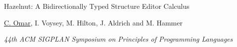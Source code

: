 \documentclass[10pt,letterpaper]{article}
\renewenvironment{itemize}{
  \begin{list}{}{
    \setlength{\leftmargin}{1.25em}
    \setlength{\itemsep}{0.25em}
    \setlength{\parskip}{0pt}
    \setlength{\parsep}{0.2em}
  }
}{
  \end{list}
}
\begin{document}
\begin{enumerate}[leftmargin=*, labelindent=6.5em, font=\bfseries]
  \item[POPL 2017] {Hazelnut: A Bidirectionally Typed Structure Editor Calculus}
        \begin{itemize}
          \item \underline{C. Omar}, I. Voysey, M. Hilton, J. Aldrich and M. Hammer
          \item \textit{44th ACM SIGPLAN Symposium on Principles of Programming Languages} 
        \end{itemize}
\end{enumerate}
\end{document}
